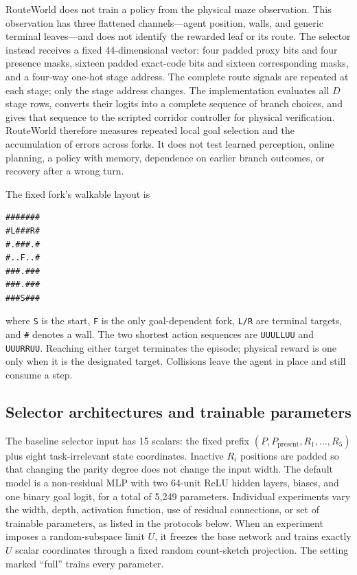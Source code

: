RouteWorld does not train a policy from the physical maze observation. This observation has three flattened channels---agent position, walls, and generic terminal leaves---and does not identify the rewarded leaf or its route. The selector instead receives a fixed 44-dimensional vector: four padded proxy bits and four presence masks, sixteen padded exact-code bits and sixteen corresponding masks, and a four-way one-hot stage address. The complete route signals are repeated at each stage; only the stage address changes. The implementation evaluates all $D$ stage rows, converts their logits into a complete sequence of branch choices, and gives that sequence to the scripted corridor controller for physical verification. RouteWorld therefore measures repeated local goal selection and the accumulation of errors across forks. It does not test learned perception, online planning, a policy with memory, dependence on earlier branch outcomes, or recovery after a wrong turn.

The fixed fork's walkable layout is
\begin{center}
\begin{minipage}{0.28\linewidth}
\begin{verbatim}
#######
#L###R#
#.###.#
#..F..#
###.###
###.###
###S###
\end{verbatim}
\end{minipage}
\end{center}
where \texttt{S} is the start, \texttt{F} is the only goal-dependent fork, \texttt{L/R} are terminal targets, and \texttt{\#} denotes a wall. The two shortest action sequences are \texttt{UUULLUU} and \texttt{UUURRUU}. Reaching either target terminates the episode; physical reward is one only when it is the designated target. Collisions leave the agent in place and still consume a step.

\subsection{Selector architectures and trainable parameters}

The baseline selector input has 15 scalars: the fixed prefix $(P,P_{\mathrm{present}},R_1,\ldots,R_5)$ plus eight task-irrelevant state coordinates. Inactive $R_i$ positions are padded so that changing the parity degree does not change the input width. The default model is a non-residual MLP with two 64-unit ReLU hidden layers, biases, and one binary goal logit, for a total of 5,249 parameters. Individual experiments vary the width, depth, activation function, use of residual connections, or set of trainable parameters, as listed in the protocols below. When an experiment imposes a random-subspace limit $U$, it freezes the base network and trains exactly $U$ scalar coordinates through a fixed random count-sketch projection. The setting marked ``full'' trains every parameter.

